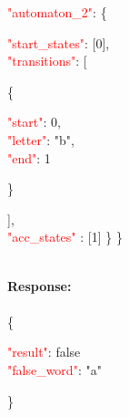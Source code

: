    \begin{adjustwidth}{7.5 mm}{0 cm}

   \textcolor{red}{"automaton\_2"}: \{
     \begin{adjustwidth}{7.5 mm}{0 cm}
            \textcolor{red}{"start\_states"}: [0],\\
            \textcolor{red}{"transitions"}: [
            \begin{adjustwidth}{7.5 mm}{0 cm}
            \{
               \begin{adjustwidth}{7.5 mm}{0 cm}
                    \textcolor{red}{"start"}: 0,\\
                    \textcolor{red}{"letter"}: "b",\\
                    \textcolor{red}{"end"}: 1
               \end{adjustwidth}
            \}
            \end{adjustwidth}
            ],\\
        \textcolor{red}{"acc\_states" }: [1]  \} \}
    \end{adjustwidth}
\end{adjustwidth}
\ \\
\textbf{Response:}\\
\ \\
\{
\begin{adjustwidth}{7.5 mm}{0 cm}
    \textcolor{red}{"result"}: false\\
    \textcolor{red}{"false\_word"}: "a"\\
\end{adjustwidth}
\}